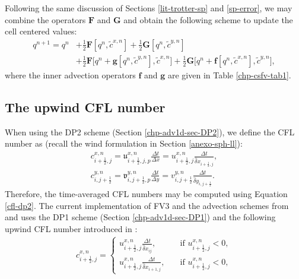 Following the same discussion of Sections \ref{lit-trotter-sp} and  \ref{sp-error}, we may combine the operators $\mathbf{F}$ and $\mathbf{G}$ and
obtain the following scheme to update the cell centered values:
\begin{align}
	\label{q-split}
	q^{n+1} = q^n &+ \frac{1}{2}\mathbf{F}[q^n,\tilde{c}^{x,n}] + \frac{1}{2}\mathbf{G}[q^n,\tilde{c}^{y,n}]\nonumber \\
	&+\frac{1}{2}\mathbf{F}\bigg[q^n + \mathbf{g}[q^n, \tilde{c}^{y,n}], \tilde{c}^{x,n}\bigg]+
	\frac{1}{2}\mathbf{G}\bigg[q^n + \mathbf{f}[q^n, \tilde{c}^{x,n}], \tilde{c}^{y,n}\bigg],
\end{align}
where the inner advection operators $\mathbf{f}$ and $\mathbf{g}$ are given in Table \ref{chp-csfv-tab1}.

\subsection{The upwind CFL number}
\label{sec-cfl}
When using the DP2 scheme (Section \ref{chp-adv1d-sec-DP2}), we define the CFL number as (recall the wind formulation in Section \ref{anexo-sph-ll}):
\begin{align}
	\label{cfl_dp2-x}
	{c}_{i+\frac{1}{2},j}^{x,n} = {\mathfrak{u}}_{i+\frac{1}{2},j,p}^{x,n}\frac{\Delta t}{\Delta x}
	= {{u}}_{i+\frac{1}{2},j}^{x,n}\frac{\Delta t}{\hat{\delta} x_{i+\frac{1}{2},j}},\\
	\label{cfl_dp2-y}
	{c}_{i,j+\frac{1}{2}}^{y,n} = {\mathfrak{v}}_{i,j+\frac{1}{2},p}^{y,n}\frac{\Delta t}{\Delta y}
	= {{v}}_{i,j+\frac{1}{2}}^{y,n}\frac{\Delta t}{\hat{\delta} y_{i,j+\frac{1}{2}}}.
\end{align}
Therefore, the time-averaged CFL numbers may be computed using Equation \eqref{cfl-dp2}.
The current implementation of FV3 and the advection schemes from \citet{lin:2004} and \citet{putman:2007}
uses the DP1 scheme (Section \ref{chp-adv1d-sec-DP1}) and the following upwind CFL number introduced in \citet{lin:1994}:
\begin{align}
	\label{cfl_dp1-x}
{c}_{i+\frac{1}{2},j}^{x,n} =
	\begin{cases}
        {{u}}_{i+\frac{1}{2},j}^{x,n}\frac{\Delta t}{\hat{\delta} x_{ij}},
        \quad &\text{if }{{{u}}_{i+\frac{1}{2},j}^{x,n} < 0},\\
         {{u}}_{i+\frac{1}{2},j}^{x,n}\frac{\Delta t}{\hat{\delta} x_{i+1,j}},
	 	\quad &\text{if }{{{u}}_{i+\frac{1}{2},j}^{x,n} < 0},
	\end{cases}
\end{align}
